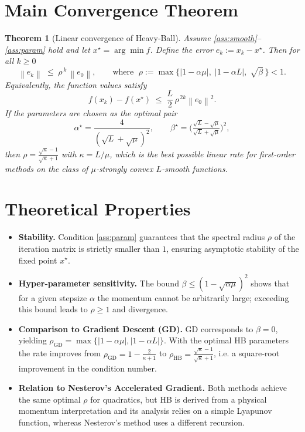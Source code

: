 \documentclass{article}
\newcommand{\norm}[1]{\left\|#1\right\|}
\newtheorem{theorem}{Theorem}
\begin{document}
\section*{Main Convergence Theorem}
\begin{theorem}[Linear convergence of Heavy‑Ball]\label{thm:hb}
Assume \ref{ass:smooth}–\ref{ass:param} hold and let $x^\star=\arg\min f$.  Define the error $e_k:=x_k-x^\star$.  Then for all $k\ge 0$
\[
\norm{e_k}\;\le\;\rho^{\,k}\,\norm{e_0},
\qquad\text{where }\;
\rho:=\max\bigl\{|1-\alpha\mu|,\;|1-\alpha L|,\;\sqrt{\beta}\,\bigr\}<1.
\tag{T1}
\]
Equivalently, the function values satisfy
\[
f(x_k)-f(x^\star)\;\le\; \frac{L}{2}\,\rho^{\,2k}\norm{e_0}^{2}.
\tag{T2}
\]
If the parameters are chosen as the optimal pair
\[
\alpha^{\star}= \frac{4}{(\sqrt{L}+\sqrt{\mu})^{2}},\qquad
\beta^{\star}= \bigl(\tfrac{\sqrt{L}-\sqrt{\mu}}{\sqrt{L}+\sqrt{\mu}}\bigr)^{2},
\]
then $\rho = \frac{\sqrt{\kappa}-1}{\sqrt{\kappa}+1}$ with $\kappa=L/\mu$, which is the best possible linear rate for first‑order methods on the class of $\mu$‑strongly convex $L$‑smooth functions.
\end{theorem}

\section*{Theoretical Properties}
\begin{itemize}
\item \textbf{Stability.}  Condition \eqref{ass:param} guarantees that the spectral radius $\rho$ of the iteration matrix is strictly smaller than $1$, ensuring asymptotic stability of the fixed point $x^\star$.
\item \textbf{Hyper‑parameter sensitivity.}  The bound $\beta\le(1-\sqrt{\alpha\mu})^{2}$ shows that for a given stepsize $\alpha$ the momentum cannot be arbitrarily large; exceeding this bound leads to $\rho\ge1$ and divergence.
\item \textbf{Comparison to Gradient Descent (GD).}  GD corresponds to $\beta=0$, yielding $\rho_{\text{GD}}=\max\{|1-\alpha\mu|,|1-\alpha L|\}$.  With the optimal HB parameters the rate improves from $\rho_{\text{GD}}=1-\frac{2}{\kappa+1}$ to $\rho_{\text{HB}}=\frac{\sqrt{\kappa}-1}{\sqrt{\kappa}+1}$, i.e. a square‑root improvement in the condition number.
\item \textbf{Relation to Nesterov’s Accelerated Gradient.}  Both methods achieve the same optimal $\rho$ for quadratics, but HB is derived from a physical momentum interpretation and its analysis relies on a simple Lyapunov function, whereas Nesterov’s method uses a different recursion.
\end{itemize}
\end{document}
